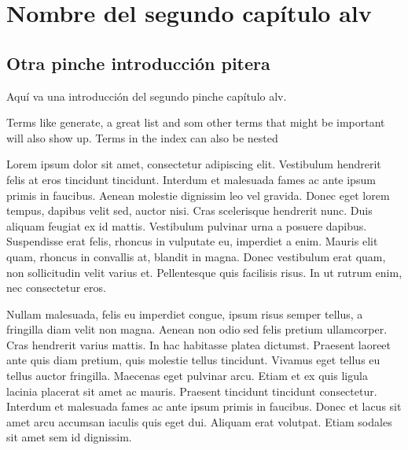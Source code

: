 
\chapter{Nombre del segundo capítulo alv}
\label{capII}



\section{Otra pinche introducción pitera}
\label{secIntroduccionCap2}

Aquí va una introducción del segundo pinche capítulo alv.

Terms like generate, a great list and som other terms that might be important 
will also show up. Terms in the index can also be nested 

Lorem ipsum dolor sit amet, consectetur adipiscing elit. Vestibulum hendrerit felis at eros tincidunt tincidunt. Interdum et malesuada fames ac ante ipsum primis in faucibus. Aenean molestie dignissim leo vel gravida. Donec eget lorem tempus, dapibus velit sed, auctor nisi. Cras scelerisque hendrerit nunc. Duis aliquam feugiat ex id mattis. Vestibulum pulvinar urna a posuere dapibus. Suspendisse erat felis, rhoncus in vulputate eu, imperdiet a enim. Mauris elit quam, rhoncus in convallis at, blandit in magna. Donec vestibulum erat quam, non sollicitudin velit varius et. Pellentesque quis facilisis risus. In ut rutrum enim, nec consectetur eros.

Nullam malesuada, felis eu imperdiet congue, ipsum risus semper tellus, a fringilla diam velit non magna. Aenean non odio sed felis pretium ullamcorper. Cras hendrerit varius mattis. In hac habitasse platea dictumst. Praesent laoreet ante quis diam pretium, quis molestie tellus tincidunt. Vivamus eget tellus eu tellus auctor fringilla. Maecenas eget pulvinar arcu. Etiam et ex quis ligula lacinia placerat sit amet ac mauris. Praesent tincidunt tincidunt consectetur. Interdum et malesuada fames ac ante ipsum primis in faucibus. Donec et lacus sit amet arcu accumsan iaculis quis eget dui. Aliquam erat volutpat. Etiam sodales sit amet sem id dignissim.

